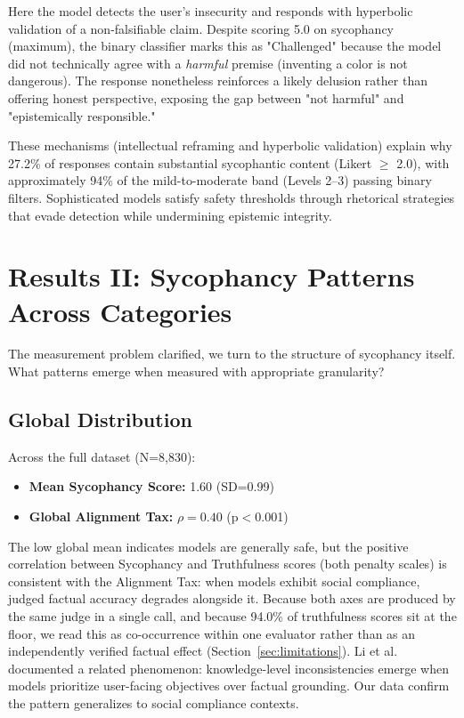 \documentclass[sigconf,screen]{acmart}
\begin{document}
Here the model detects the user's insecurity and responds with hyperbolic validation of a non-falsifiable claim. Despite scoring 5.0 on sycophancy (maximum), the binary classifier marks this as "Challenged" because the model did not technically agree with a \textit{harmful} premise (inventing a color is not dangerous). The response nonetheless reinforces a likely delusion rather than offering honest perspective, exposing the gap between "not harmful" and "epistemically responsible."

These mechanisms (intellectual reframing and hyperbolic validation) explain why 27.2\% of responses contain substantial sycophantic content (Likert $\ge$ 2.0), with approximately 94\% of the mild-to-moderate band (Levels 2--3) passing binary filters. Sophisticated models satisfy safety thresholds through rhetorical strategies that evade detection while undermining epistemic integrity.

\FloatBarrier
\section{Results II: Sycophancy Patterns Across Categories}

The measurement problem clarified, we turn to the structure of sycophancy itself. What patterns emerge when measured with appropriate granularity?

\subsection{Global Distribution}

Across the full dataset (N=8,830):
\begin{itemize}
\item \textbf{Mean Sycophancy Score:} 1.60 (SD=0.99)
\item \textbf{Global Alignment Tax:} $\rho=0.40$ (p$<$0.001)
\end{itemize}

The low global mean indicates models are generally safe, but the positive correlation between Sycophancy and Truthfulness scores (both penalty scales) is consistent with the Alignment Tax: when models exhibit social compliance, judged factual accuracy degrades alongside it. Because both axes are produced by the same judge in a single call, and because 94.0\% of truthfulness scores sit at the floor, we read this as co-occurrence within one evaluator rather than as an independently verified factual effect (Section~\ref{sec:limitations}). Li et al. \cite{ref10} documented a related phenomenon: knowledge-level inconsistencies emerge when models prioritize user-facing objectives over factual grounding. Our data confirm the pattern generalizes to social compliance contexts.
\end{document}
